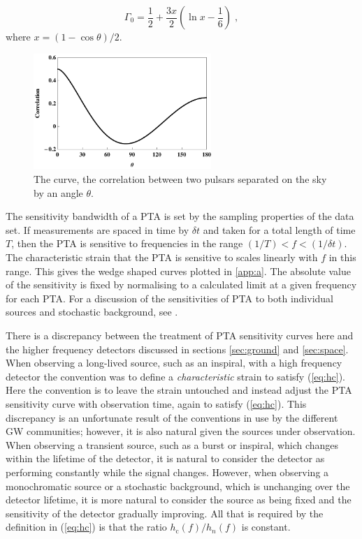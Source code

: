 \begin{equation}
\Gamma_{0} = \frac{1}{2}+\frac{3x}{2}\left(\ln x -\frac{1}{6}\right) \; ,
\end{equation}
where $x = (1-\cos\theta)/{2}.$
\begin{figure}
 \centering
 \includegraphics[trim=0cm 0cm 0cm 0cm, width=0.6\textwidth]{HnDcurve.pdf}
 \caption{The \citet{HellingsDowns} curve, the correlation between two pulsars separated on the sky by an angle $\theta$.}
 \label{fig:HnD}
\end{figure}

The sensitivity bandwidth of a PTA is set by the sampling properties of the data set. If measurements are spaced in time by $\delta t$ and taken for a total length of time $T$, then the PTA is sensitive to frequencies in the range $(1/T) < f < (1/\delta t)$. The characteristic strain that the PTA is sensitive to scales linearly with $f$ in this range. This gives the wedge shaped curves plotted in \ref{app:a}. The absolute value of the sensitivity is fixed by normalising to a calculated limit at a given frequency for each PTA. For a discussion of the sensitivities of PTA to both individual sources and stochastic background, see \citet{MooreTaylorGair}.

There is a discrepancy between the treatment of PTA sensitivity curves here and the higher frequency detectors discussed in sections \ref{sec:ground} and \ref{sec:space}. When observing a long-lived source, such as an inspiral, with a high frequency detector the convention was to define a \emph{characteristic} strain to satisfy (\ref{eq:hc}). Here the convention is to leave the strain untouched and instead adjust the PTA sensitivity curve with observation time, again to satisfy (\ref{eq:hc}). This discrepancy is an unfortunate result of the conventions in use by the different GW communities; however, it is also natural given the sources under observation. When observing a transient source, such as a burst or inspiral, which changes within the lifetime of the detector, it is natural to consider the detector as performing constantly while the signal changes. However, when observing a monochromatic source or a stochastic background, which is unchanging over the detector lifetime, it is more natural to consider the source as being fixed and the sensitivity of the detector gradually improving. All that is required by the definition in (\ref{eq:hc}) is that the ratio $h_\mathrm{c}(f)/h_{n}(f)$ is constant.


